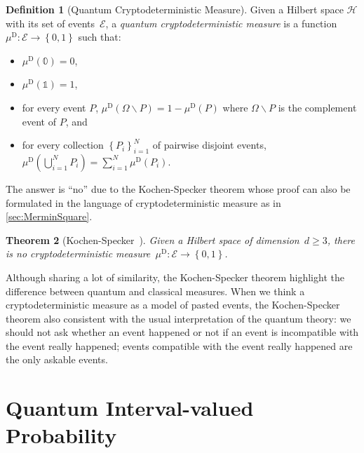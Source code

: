 \documentclass[12pt]{iopart}
\theoremstyle{plain}
\newtheorem{thm}{Theorem}
\theoremstyle{definition}
\newtheorem{definition}[thm]{Definition}
\theoremstyle{remark}
\newcommand{\Hilb}{\mathcal{H}}
\newcommand{\events}{\ensuremath{\mathcal{E}}}
\begin{document}
\begin{definition}[Quantum Cryptodeterministic Measure]\label{def:QuantumCryptodeterministicMeasures}Given
a Hilbert space $\Hilb$ with its set of events~$\events$, a \emph{quantum
cryptodeterministic measure} is a function~$\mu^{\mathrm{D}}:\events\rightarrow\left\{ 0,1\right\} $
such that: 
\begin{itemize}
\item $\mu^{\mathrm{D}}(\mathbb{0})=0$, 
\item $\mu^{\mathrm{D}}(\mathbb{1})=1$, 
\item for every event $P$, $\mu^{\mathrm{D}}\left(\Omega\backslash P\right)=1-\mu^{\mathrm{D}}\left(P\right)$
where $\Omega\backslash P$ is the complement event of $P$, and 
\item for every collection $\left\{ P_{i}\right\} _{i=1}^{N}$ of pairwise
disjoint events, $\mu^{\mathrm{D}}\left(\bigcup_{i=1}^{N}P_{i}\right)=\sum_{i=1}^{N}\mu^{\mathrm{D}}(P_{i})$. 
\end{itemize}
\end{definition}

The answer is ``no'' due to the Kochen-Specker theorem whose proof
can also be formulated in the language of cryptodeterministic measure
as in \ref{sec:MerminSquare}.

\begin{thm}[Kochen-Specker~\cite{kochenspecker1967,peres1995quantum,Redhead1987-REDINA}]\label{thm:Kochen-Specker}Given
a Hilbert space of dimension~$d\ge3$, there is no cryptodeterministic
measure~$\mu^{\mathrm{D}}:\events\rightarrow\left\{ 0,1\right\} $.\end{thm}

Although sharing a lot of similarity, the Kochen-Specker theorem highlight
the difference between quantum and classical measures. When we think
a cryptodeterministic measure as a model of pasted events, the Kochen-Specker
theorem also consistent with the usual interpretation of the quantum
theory: we should not ask whether an event happened or not if an event
is incompatible with the event really happened; events compatible
with the event really happened are the only askable events.



\section{Quantum Interval-valued Probability}
\end{document}
